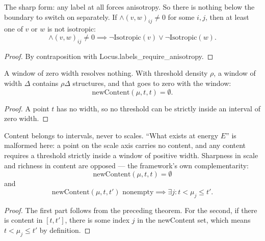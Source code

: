 \begin{theorem}
The sharp form: any label at all forces anisotropy.  So there is nothing below the boundary to switch on separately.  If $\wedge(v, w)_{ij} \neq 0$ for some $i, j$, then at least one of $v$ or $w$ is not isotropic:
\begin{equation}
\wedge(v, w)_{ij} \neq 0 \implies \neg \text{Isotropic}(v) \lor \neg \text{Isotropic}(w).
\end{equation}
\begin{proof}
By contraposition with Locus.labels\_require\_anisotropy.
\end{proof}
\end{theorem}

\begin{theorem}
A window of zero width resolves nothing.  With threshold density $\rho$, a window of width $\Delta$ contains $\rho \Delta$ structures, and that goes to zero with the window:
\begin{equation}
\text{newContent}(\mu, t, t) = \emptyset.
\end{equation}
\begin{proof}
A point $t$ has no width, so no threshold can be strictly inside an interval of zero width.
\end{proof}
\end{theorem}

\begin{theorem}
Content belongs to intervals, never to scales.  ``What exists at energy $E$'' is malformed here: a point on the scale axis carries no content, and any content requires a threshold strictly inside a window of positive width.  Sharpness in scale and richness in content are opposed — the framework's own complementarity:
\begin{equation}
\text{newContent}(\mu, t, t) = \emptyset
\end{equation}
and
\begin{equation}
\text{newContent}(\mu, t, t') \text{ nonempty} \implies \exists j : t < \mu_j \le t'.
\end{equation}
\begin{proof}
The first part follows from the preceding theorem.  For the second, if there is content in $[t, t']$, there is some index $j$ in the newContent set, which means $t < \mu_j \le t'$ by definition.
\end{proof}
\end{theorem}

